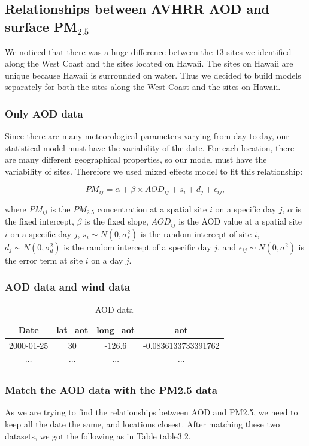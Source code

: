 \documentclass[10pt]{article}
\begin{document}
\subsection{Relationships between AVHRR AOD and surface PM$_{2.5}$}
We noticed that there was a huge difference between the  $13$ sites we identified along the West Coast and the sites located on Hawaii. The sites on Hawaii are unique because Hawaii is surrounded on water. Thus we decided to build models separately for both the sites along the West Coast and the sites on Hawaii. 

\subsubsection{Only AOD data}
Since there are many meteorological parameters varying from day to day, our statistical model must have the variability of the date. For each location, there are many different geographical properties, so our model must have the variability of sites. Therefore we used mixed effects model to fit this relationship:

$$PM_{ij} = \alpha + \beta\times AOD_{ij} + s_i + d_j+ \epsilon_{ij}, $$

where $PM_{ij}$ is the $PM_{2.5}$ concentration at a spatial site $i$ on a specific day $j$, $\alpha$ is the fixed intercept, $\beta$ is the fixed slope, $AOD_{ij}$ is the AOD value at a spatial site $i$ on a specific day $j$, $s_i\sim N(0, \sigma_s^2)$ is the random intercept of site $i$, $d_j\sim N(0, \sigma_d^2)$ is the random intercept of a specific day $j$, and $\epsilon_{ij}\sim N(0, \sigma^2)$ is the error term at site $i$ on a day $j$.

\subsubsection{AOD data and wind data}


\begin{table}[!h]
\centering
\begin{tabular}{|c|c|c|c|}
\hline 
Date & lat\_aot & long\_aot & aot\\
\hline
2000-01-25 & 30 & -126.6 & -0.0836133733391762 \\
\hline
$\cdots$ & $\cdots$ & $\cdots$ & $\cdots$\\
\hline
\end{tabular}
\caption{AOD data}
\label{table3.1}
\end{table}

\subsubsection{Match the AOD data with the PM2.5 data}
As we are trying to find the relationships between AOD and PM2.5, we need to keep all the date the same, and locations closest. After matching these two datasets, we got the following as in Table {table3.2}.
\end{document}

